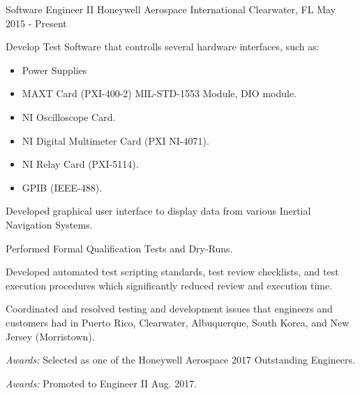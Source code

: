 

\begin{cventries}

  \cventry
    {Software Engineer II} %
    {Honeywell Aerospace International} %
    {Clearwater, FL} %
    {May 2015 - Present} %
    {
      \begin{cvitems} %
				\item {Develop Test Software that controlls several hardware interfaces, such as:}
				\begin{itemize}
					\item Power Supplies
					\item MAXT Card (PXI-400-2) MIL-STD-1553 Module, DIO module.
					\item NI Oscilloscope Card.
					\item NI Digital Multimeter Card (PXI NI-4071).
					\item NI Relay Card (PXI-5114).
					\item GPIB (IEEE-488).
				\end{itemize}
				\item {Developed graphical user interface to display data from various Inertial Navigation Systems.}
				\item {Performed Formal Qualification Tests and Dry-Runs.}
				\item {Developed automated test scripting standards, test review checklists, and test execution procedures which significantly reduced review and execution time.}
				\item {Coordinated and resolved testing and development issues that engineers and customers had in Puerto Rico, Clearwater, Albuquerque, South Korea, and New Jersey (Morristown).}
				\item {{\it Awards:} Selected as one of the Honeywell Aerospace 2017 Outstanding Engineers.}
				\item {{\it Awards:} Promoted to Engineer II Aug. 2017.}
      \end{cvitems}
    }


\end{cventries}
